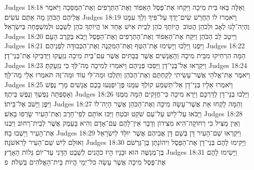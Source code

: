 Judges 18:18	וְאֵלֶּה בָּאוּ בֵּית מִיכָה וַיִּקְחוּ אֶת־פֶּסֶל הָאֵפוֹד וְאֶת־הַתְּרָפִים וְאֶת־הַמַּסֵּכָה וַיֹּאמֶר אֲלֵיהֶם הַכֹּהֵן מָה אַתֶּם עֹשִׂים׃
Judges 18:19	וַיֹּאמְרוּ לוֹ הַחֲרֵשׁ שִׂים־יָדְךָ עַל־פִּיךָ וְלֵךְ עִמָּנוּ וֶהְיֵה־לָנוּ לְאָב וּלְכֹהֵן הֲטוֹב  הֱיוֹתְךָ כֹהֵן לְבֵית אִישׁ אֶחָד אוֹ הֱיוֹתְךָ כֹהֵן לְשֵׁבֶט וּלְמִשְׁפָּחָה בְּיִשְׂרָאֵל׃
Judges 18:20	וַיִּיטַב לֵב הַכֹּהֵן וַיִּקַּח אֶת־הָאֵפוֹד וְאֶת־הַתְּרָפִים וְאֶת־הַפָּסֶל וַיָּבֹא בְּקֶרֶב הָעָם׃
Judges 18:21	וַיִּפְנוּ וַיֵּלֵכוּ וַיָּשִׂימוּ אֶת־הַטַּף וְאֶת־הַמִּקְנֶה וְאֶת־הַכְּבוּדָּה לִפְנֵיהֶם׃
Judges 18:22	הֵמָּה הִרְחִיקוּ מִבֵּית מִיכָה וְהָאֲנָשִׁים אֲשֶׁר בַּבָּתִּים אֲשֶׁר עִם־בֵּית מִיכָה נִזְעֲקוּ וַיַּדְבִּיקוּ אֶת־בְּנֵי־דָן׃
Judges 18:23	וַיִּקְרְאוּ אֶל־בְּנֵי־דָן וַיַּסֵּבּוּ פְּנֵיהֶם וַיֹּאמְרוּ לְמִיכָה מַה־לְּךָ כִּי נִזְעָקְתָּ׃
Judges 18:24	וַיֹּאמֶר אֶת־אֱלֹהַי אֲשֶׁר־עָשִׂיתִי לְקַחְתֶּם וְאֶת־הַכֹּהֵן וַתֵּלְכוּ וּמַה־לִּי עוֹד וּמַה־זֶּה תֹּאמְרוּ אֵלַי מַה־לָּךְ׃
Judges 18:25	וַיֹּאמְרוּ אֵלָיו בְּנֵי־דָן אַל־תַּשְׁמַע קוֹלְךָ עִמָּנוּ פֶּן־יִפְגְּעוּ בָכֶם אֲנָשִׁים מָרֵי נֶפֶשׁ וְאָסַפְתָּה נַפְשְׁךָ וְנֶפֶשׁ בֵּיתֶךָ׃
Judges 18:26	וַיֵּלְכוּ בְנֵי־דָן לְדַרְכָּם וַיַּרְא מִיכָה כִּי־חֲזָקִים הֵמָּה מִמֶּנּוּ וַיִּפֶן וַיָּשׁב אֶל־בֵּיתוֹ׃
Judges 18:27	וְהֵמָּה לָקְחוּ אֵת אֲשֶׁר־עָשָׂה מִיכָה וְאֶת־הַכֹּהֵן אֲשֶׁר הָיָה־לוֹ וַיָּבֹאוּ עַל־לַיִשׁ עַל־עַם שֹׁקֵט וּבֹטֵחַ וַיַּכּוּ אוֹתָם לְפִי־חָרֶב וְאֶת־הָעִיר שָׂרְפוּ בָאֵשׁ׃
Judges 18:28	וְאֵין מַצִּיל כִּי רְחוֹקָה־הִיא מִצִּידוֹן וְדָבָר אֵין־לָהֶם עִם־אָדָם וְהִיא בָּעֵמֶק אֲשֶׁר לְבֵית־רְחוֹב וַיִּבְנוּ אֶת־הָעִיר וַיֵּשְׁבוּ בָהּ׃
Judges 18:29	וַיִּקְרְאוּ שֵׁם־הָעִיר דָּן בְּשֵׁם דָּן אֲבִיהֶם אֲשֶׁר יוּלַּד לְיִשְׂרָאֵל וְאוּלָם לַיִשׁ שֵׁם־הָעִיר לָרִאשֹׁנָה׃
Judges 18:30	וַיָּקִימוּ לָהֶם בְּנֵי־דָן אֶת־הַפָּסֶל וִיהוֹנָתָן בֶּן־גֵּרְשֹׁם בֶּן־מְנַשֶּׁה הוּא וּבָנָיו הָיוּ כֹהֲנִים לְשֵׁבֶט הַדָּנִי עַד־יוֹם גְּלוֹת הָאָרֶץ׃
Judges 18:31	וַיָּשִׂימוּ לָהֶם אֶת־פֶּסֶל מִיכָה אֲשֶׁר עָשָׂה כּל־יְמֵי הֱיוֹת בֵּית־הָאֱלֹהִים בְּשִׁלֹה׃ {פ}
